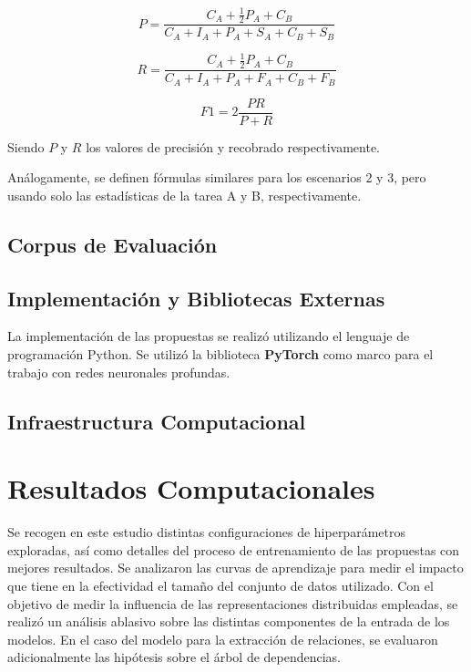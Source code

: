 \begin{equation*}
P = \frac{C_A + \frac{1}{2}P_A + C_B}{C_A + I_A + P_A + S_A + C_B + S_B}
\end{equation*}

\begin{equation*}
R = \frac{C_A + \frac{1}{2}P_A + C_B}{C_A + I_A + P_A + F_A + C_B + F_B}
\end{equation*}

\begin{equation*}
F1 = 2\frac{PR}{P+R}
\end{equation*}

Siendo $P$ y $R$ los valores de precisión y recobrado respectivamente.

Análogamente, se definen fórmulas similares para los escenarios 2 y 3, pero usando solo las estadísticas de la tarea A y B, respectivamente.

\subsection{Corpus de Evaluación}


\subsection{Implementación y Bibliotecas Externas}

La implementación de las propuestas se realizó utilizando el lenguaje de programación Python.
Se utilizó la biblioteca \textbf{PyTorch} como marco para el trabajo con redes neuronales profundas.

\subsection{Infraestructura Computacional}


\section{Resultados Computacionales}

Se recogen en este estudio distintas configuraciones de hiperparámetros exploradas, así como detalles del proceso de entrenamiento de las propuestas con mejores resultados.
Se analizaron las curvas de aprendizaje para medir el impacto que tiene en la efectividad el tamaño del conjunto de datos utilizado.
Con el objetivo de medir la influencia de las representaciones distribuidas empleadas, se realizó un análisis ablasivo sobre las distintas componentes de la entrada de los modelos.
En el caso del modelo para la extracción de relaciones, se evaluaron adicionalmente las hipótesis sobre el árbol de dependencias.

